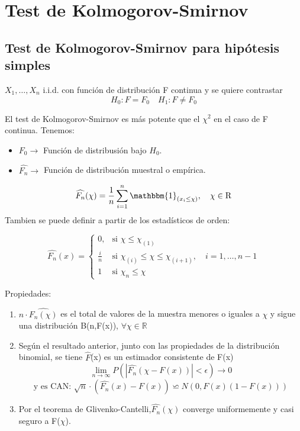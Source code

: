 \section{Test de Kolmogorov-Smirnov}
\subsection{Test de Kolmogorov-Smirnov para hipótesis simples}

$X_1,\dots, X_n$ i.i.d. con función de distribución F continua y se quiere contrastar
\[
    H_0: F=F_0 \quad H_1: F \neq F_0
\]

El test de Kolmogorov-Smirnov es más potente que el $\chi^2$ en el caso de F continua.
Tenemos:
\begin{itemize}
    \item $F_0 \to $ Función de distribusión bajo $H_0$.
    \item $\widehat{F_n} \to$ Función de distribución muestral o empírica.
\end{itemize}
\[
    \widehat{F_n}(\chi)=\frac{1}{n} \sum_{i=1}^{n} \mathbbm{1}_{(x_i \leq \chi)}, \quad \chi \in \mathrm{R}
\]
Tambien se puede definir a partir de los estadísticos de orden:

\[
    \widehat{F_n}(x)=
    \left\{
    \begin{array}{ll}
        0, & \text{si } \chi \leq \chi_{(1)}\\
        \frac{i}{n} & \text{si } \chi_{(i)} \leq \chi \leq \chi_{(i+1)}, \quad i=1,\dots,n-1 \\
        1 & \text{si } \chi_{n} \leq \chi
    \end{array}
    \right.
\]

Propiedades:
\begin{enumerate}
    \item $n\cdot \widehat{F_n(\chi)}$ es el total de valores de la muestra menores o iguales a $\chi$ y sigue una distribución B(n,F(x)), $\forall \chi \in \mathbb{R}$
    \item Según el resultado anterior, junto con las propiedades de la distribución binomial, se tiene $\widehat{F}$(x) es un estimador consistente de F(x)
    \[
        \lim_{n \to \infty} P(|\widehat{F_n}(\chi - F(x))| < \epsilon) \to 0
    \]
    \[
        \text{y es CAN: }\sqrt{n}\cdot(\widehat{F_n}(x)-F(x))\backsimeq N(0,F(x)(1-F(x)))
    \]
    \item Por el teorema de Glivenko-Cantelli,$\widehat{F_n}(\chi)$ converge uniformemente y casi seguro a F($\chi$).
\end{enumerate}

